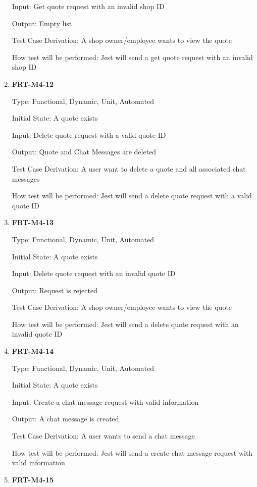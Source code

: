 \documentclass[12pt, titlepage]{article}
\begin{document}
\begin{enumerate}
	      Input: Get quote request with an invalid shop ID

	      Output: Empty list

	      Test Case Derivation: A shop owner/employee wants to view the quote

	      How test will be performed: Jest will send a get quote request with an invalid shop ID

	\item \textbf{FRT-M4-12}

	      Type: Functional, Dynamic, Unit, Automated

	      Initial State: A quote exists

	      Input: Delete quote request with a valid quote ID

	      Output: Quote and Chat Messages are deleted

	      Test Case Derivation: A user want to delete a quote and all associated chat messages

	      How test will be performed: Jest will send a delete quote request with a valid quote ID

	\item \textbf{FRT-M4-13}

	      Type: Functional, Dynamic, Unit, Automated

	      Initial State: A quote exists

	      Input: Delete quote request with an invalid quote ID

	      Output: Request is rejected

	      Test Case Derivation: A shop owner/employee wants to view the quote

	      How test will be performed: Jest will send a delete quote request with an invalid quote ID

	\item \textbf{FRT-M4-14}

	      Type: Functional, Dynamic, Unit, Automated

	      Initial State: A quote exists

	      Input: Create a chat message request with valid information

	      Output: A chat message is created

	      Test Case Derivation: A user wants to send a chat message

	      How test will be performed: Jest will send a create chat message request with valid information

	\item \textbf{FRT-M4-15}


\end{enumerate}
\end{document}
